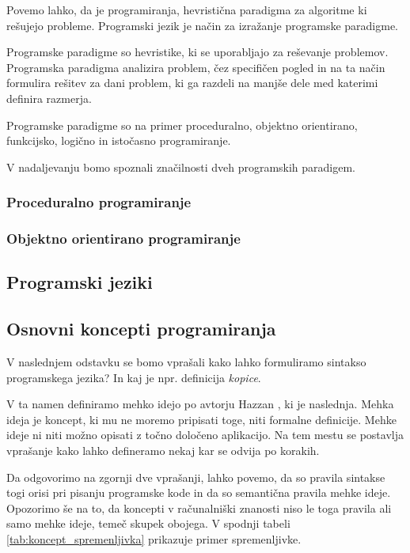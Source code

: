 Povemo lahko, da je programiranja, hevristična paradigma za algoritme
ki rešujejo probleme. Programski jezik je način za izražanje
programske paradigme.

Programske paradigme so hevristike, ki se uporabljajo za reševanje
problemov. Programska paradigma analizira problem, čez specifičen
pogled in na ta način formulira rešitev za dani problem, ki ga razdeli
na manjše dele med katerimi definira razmerja.

Programske paradigme so na primer proceduralno, objektno orientirano,
funkcijsko, logično in istočasno programiranje.

V nadaljevanju bomo spoznali značilnosti dveh programskih paradigem.

\subsubsection{Proceduralno programiranje}
\label{sec:proceduralno_programiranje}

\subsubsection{Objektno orientirano programiranje}
\label{sec:objektno_orijentirano_programiranje}

\subsection{Programski jeziki}
\label{sec:programski_jeziki}

\subsection{Osnovni koncepti programiranja}
\label{sec:Osnvni koncepti_programiranja}

V naslednjem odstavku se bomo vprašali kako lahko formuliramo sintakso
programskega jezika? In kaj je npr. definicija \emph{kopice}.

V ta namen definiramo mehko idejo po avtorju Hazzan \cite{guideTCS},
ki je naslednja. Mehka ideja je koncept, ki mu ne moremo pripisati
toge, niti formalne definicije. Mehke ideje ni niti možno opisati z
točno določeno aplikacijo. Na tem mestu se postavlja vprašanje kako
lahko defineramo nekaj kar se odvija po korakih.

Da odgovorimo na zgornji dve vprašanji, lahko povemo, da so pravila
sintakse togi orisi pri pisanju programske kode in da so semantična
pravila mehke ideje. Opozorimo še na to, da koncepti v računalniški
znanosti niso le toga pravila ali samo mehke ideje, temeč skupek
obojega. V spodnji tabeli \ref{tab:koncept_spremenljivka} prikazuje
primer spremenljivke.


